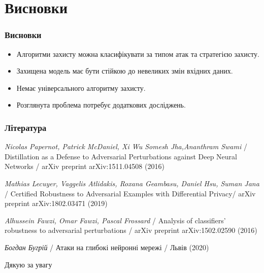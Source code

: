 \documentclass{beamer}
\numberwithin{equation}{section}
\begin{document}
	\section{Висновки}
	\begin{frame}
		\frametitle{Висновки}
		
		\begin{itemize}
			\item Алгоритми захисту можна класифікувати за типом атак та стратегією захисту.
			\item Захищена модель має бути стійкою до невеликих змін вхідних даних.
			
			\item Немає універсального алгоритму захисту.
			\item Розглянута проблема потребує додаткових досліджень.
		\end{itemize}
	\end{frame}
		
\begin{frame}
	\thispagestyle{empty}
	\frametitle{Література}
	\begin{thebibliography}{99}
		

		\textit{Nicolas Papernot, Patrick McDaniel, Xi Wu Somesh Jha,Ananthram Swami} /
		Distillation as a Defense to Adversarial Perturbations against Deep Neural Networks /
		arXiv preprint arXiv:1511.04508 (2016)
		
		\textit{Mathias Lecuyer, Vaggelis Atlidakis, Roxana Geambasu, Daniel Hsu, Suman Jana} /
		Certified Robustness to Adversarial Examples with Differential Privacy/
		arXiv preprint arXiv:1802.03471 (2019)
		
		\textit{Alhussein Fawzi, Omar Fawzi, Pascal Frossard} /
		Analysis of classifiers' robustness to adversarial perturbations /
		arXiv preprint arXiv:1502.02590 (2016)
		
		\textit{Богдан Бугрій} /
		Атаки на глибокі нейронні мережі /
		Львів (2020)
		
		
	\end{thebibliography}
\end{frame}

 \begin{frame}
	\begin{center}
		\LARGE
		Дякую за увагу\\
	\end{center}
\end{frame}
\end{document}
